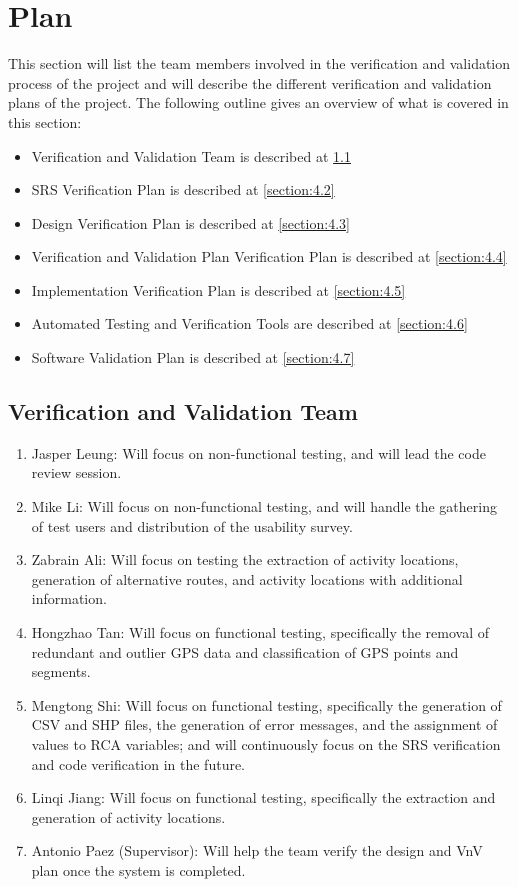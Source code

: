 \documentclass[12pt, titlepage]{article}
\begin{document}
\section{Plan}
\label{section:4}
This section will list the team members involved in the verification and validation process of the project and will describe the different verification and validation plans of the project. The following outline gives an overview of what is covered in this section:
\begin{itemize}
    \item Verification and Validation Team is described at \ref{section:4.1}
    \item SRS Verification Plan is described at \ref{section:4.2}
    \item Design Verification Plan is described at \ref{section:4.3}
    \item Verification and Validation Plan Verification Plan is described at \ref{section:4.4}
    \item Implementation Verification Plan is described at \ref{section:4.5}
    \item Automated Testing and Verification Tools are described at \ref{section:4.6}
    \item Software Validation Plan is described at \ref{section:4.7}
\end{itemize}

\subsection{Verification and Validation Team}
\label{section:4.1}
\begin{enumerate}
  \item Jasper Leung: Will focus on non-functional testing, and will lead the code review session.
  \item Mike Li: Will focus on non-functional testing, and will handle the gathering of test users and distribution of the usability survey.
  \item Zabrain Ali: Will focus on testing the extraction of activity locations, generation of alternative routes, and activity locations with additional information.
  \item Hongzhao Tan: Will focus on functional testing, specifically the removal of redundant and outlier GPS data and classification of GPS points and segments.
  \item Mengtong Shi: Will focus on functional testing, specifically the generation of CSV and SHP files, the generation of error messages, and the assignment of values to RCA variables; and will continuously focus on the SRS verification and code verification in the future.
  \item Linqi Jiang: Will focus on functional testing, specifically the extraction and generation of activity locations.
  \item Antonio Paez (Supervisor): Will help the team verify the design and VnV plan once the system is completed.
\end{enumerate}
\end{document}
